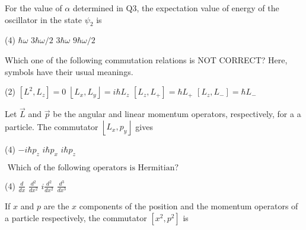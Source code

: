 \begin{enumerate}
\begin{minipage}{\textwidth}
	\item For the value of $\alpha$ determined in $\mathrm{Q} 3$, the expectation value of energy of the oscillator in the state $\psi_{2}$ is
\end{minipage}
\begin{tasks}(4)
	\task[\textbf{A.}] $\hbar \omega$
	\task[\textbf{B.}]$3 \hbar \omega / 2$ 
	\task[\textbf{C.}]$3 \hbar \omega$
	\task[\textbf{D.}]$9 \hbar \omega / 2$
\end{tasks}
\begin{minipage}{\textwidth}
	\item Which one of the following commutation relations is NOT CORRECT? Here, symbols have their usual meanings.
\end{minipage}
\begin{tasks}(2)
	\task[\textbf{A.}] $\left[L^{2}, L_{z}\right]=0$
	\task[\textbf{B.}]$\left\lfloor L_{x}, L_{y}\right\rfloor=i \hbar L_{z}$
	\task[\textbf{C.}]$\left[L_{z}, L_{+}\right]=\hbar L_{+}$
	\task[\textbf{D.}] $\left[L_{z}, L_{-}\right]=\hbar L_{-}$
\end{tasks}
\begin{minipage}{\textwidth}
	\item Let $\vec{L}$ and $\vec{p}$ be the angular and linear momentum operators, respectively, for a a particle. The commutator $\left\lfloor L_{x}, p_{y}\right\rfloor$ gives
\end{minipage}
\begin{tasks}(4)
	\task[\textbf{A.}] $-i \hbar p_{z}$
	\task[\textbf{C.}]$i \hbar p_{x}$
	\task[\textbf{D.}]$i \hbar p_{z}$
\end{tasks}
\begin{minipage}{\textwidth}
	\item $\text { Which of the following operators is Hermitian? }$
\end{minipage}
\begin{tasks}(4)
	\task[\textbf{A.}] $\frac{d}{d x}$
	\task[\textbf{B.}]$\frac{d^{2}}{d x^{2}}$
	\task[\textbf{C.}]$i \frac{d^{2}}{d x^{2}}$
	\task[\textbf{D.}]$\frac{d^{3}}{d x^{3}}$
\end{tasks}
\begin{minipage}{\textwidth}
	\item If $x$ and $p$ are the $x$ components of the position and the momentum operators of a particle respectively, the commutator $\left[x^{2}, p^{2}\right]$ is
\end{minipage}

\end{enumerate}
